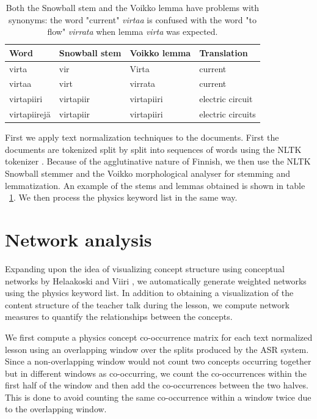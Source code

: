 \documentclass[utf8,english]{gradu3}
\begin{document}
\begin{table}[]
  \begin{tabular}{ | l | l | l | l | }
  \hline
  \textbf{Word} & \textbf{Snowball stem} & \textbf{Voikko lemma} & \textbf{Translation} \\ \hline
  virta & vir & Virta & current\\ \hline
  virtaa & virt & virrata & current\\ \hline
  virtapiiri & virtapiir & virtapiiri & electric circuit\\ \hline
  virtapiirejä & virtapiir & virtapiiri & electric circuits\\
  \hline
  \end{tabular}
  \caption{Both the Snowball stem and the Voikko lemma have problems with synonyms: the word "current" \emph{virtaa} is confused with the word "to flow" \emph{virrata} when lemma \emph{virta} was expected.}
  \label{table:stemmer}
\end{table}

First we apply text normalization techniques to the documents. First the documents are tokenized split by split into sequences of words using the NLTK tokenizer \parencite{birdNaturalLanguageProcessing2009}. Because of the agglutinative nature of Finnish, we then use the NLTK Snowball stemmer \parencite{birdNaturalLanguageProcessing2009} and the Voikko morphological analyser \parencite{pitkanenVoikkoFreeLinguistic2019}  for stemming and lemmatization. An example of the stems and lemmas obtained is shown in table ~\ref{table:stemmer}. We then process the physics keyword list in the same way. 


\section{Network analysis}

Expanding upon the idea of visualizing concept structure using conceptual networks by Helaakoski and Viiri \parencite*{helaakoskiContentContentStructure2014}, we automatically generate weighted networks using the physics keyword list. In addition to obtaining a visualization of the content structure of the teacher talk during the lesson, we compute network measures to quantify the relationships between the concepts.

We first compute a physics concept co-occurrence matrix for each text normalized lesson using an overlapping window over the splits produced by the ASR system. Since a non-overlapping window would not count two concepts occurring together but in different windows as co-occurring, we count the co-occurrences within the first half of the window and then add the co-occurrences between the two halves. This is done to avoid counting the same co-occurrence within a window twice due to the overlapping window.
\end{document}

